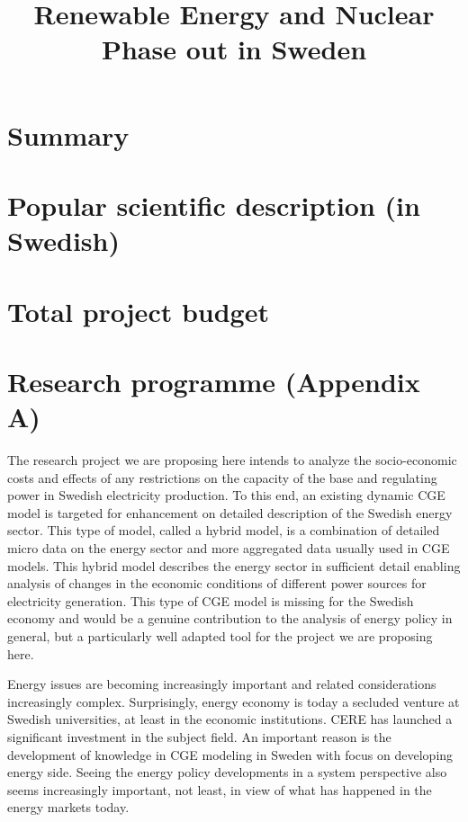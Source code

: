 \documentclass[10pt,a4paper]{article}
\begin{document}
\title{Renewable Energy and Nuclear Phase out in Sweden}
\date{}
\author{}
\maketitle

\section{Summary}
\section{Popular scientific description (in Swedish)}
\section{Total project budget}
\section{Research programme (Appendix A)}
The research project we are proposing here intends to analyze the socio-economic costs and effects of any restrictions on the capacity of the base and regulating power in Swedish electricity production. To this end, an existing dynamic CGE model is targeted for enhancement on detailed description of the Swedish energy sector. This type of model, called a hybrid model, is a combination of detailed micro data on the energy sector and more aggregated data usually used in CGE models. This hybrid model describes the energy sector in sufficient detail enabling analysis of changes in the economic conditions of different power sources for electricity generation. This type of CGE model is missing for the Swedish economy and would be a genuine contribution to the analysis of energy policy in general, but a particularly well adapted tool for the project we are proposing here.

Energy issues are becoming increasingly important and related considerations increasingly complex. Surprisingly, energy economy is today a secluded venture at Swedish universities, at least in the economic institutions. CERE has launched a significant investment in the subject field. An important reason is the development of knowledge in CGE modeling in Sweden with focus on developing energy side. Seeing the energy policy developments in a system perspective also seems increasingly important, not least, in view of what has happened in the energy markets today.
\end{document}
